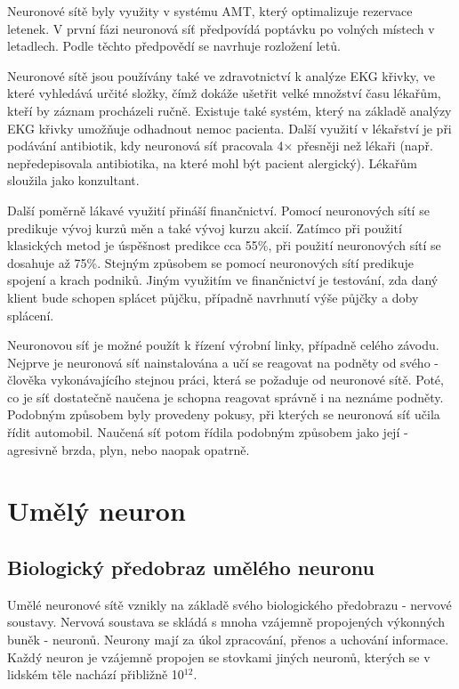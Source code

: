 \documentclass[11pt,twoside,a4paper]{book}
\begin{document}
Neuronové sítě byly využity v systému AMT, který optimalizuje rezervace letenek. V první fázi neuronová síť předpovídá poptávku po volných místech v letadlech. Podle těchto předpovědí se navrhuje rozložení letů.

Neuronové sítě jsou používány také ve zdravotnictví k analýze EKG křivky, ve které vyhledává určité složky, čímž dokáže ušetřit velké množství času lékařům, kteří by záznam procházeli ručně. Existuje také systém, který na základě analýzy EKG křivky umožňuje odhadnout nemoc pacienta. Další využití v lékařství je při podávání antibiotik, kdy neuronová síť pracovala 4\begin{math}\times\end{math} přesněji než lékaři (např. nepředepisovala antibiotika, na které mohl být pacient alergický). Lékařům sloužila jako konzultant.

Další poměrně lákavé využití přináší finančnictví. Pomocí neuronových sítí se predikuje vývoj kurzů měn a také vývoj kurzu akcií. Zatímco při použití klasických metod je úspěšnost predikce cca 55\%, při použití neuronových sítí se dosahuje až 75\%. Stejným způsobem se pomocí neuronových sítí predikuje spojení a krach podniků. Jiným využitím ve finančnictví je testování, zda daný klient bude schopen splácet půjčku, případně navrhnutí výše půjčky a doby splácení.

Neuronovou síť je možné použít k řízení výrobní linky, případně celého závodu. Nejprve je neuronová síť nainstalována a učí se reagovat na podněty od svého  - člověka vykonávajícího stejnou práci, která se požaduje od neuronové sítě. Poté, co je síť dostatečně naučena je schopna reagovat správně i na neznáme podněty. Podobným způsobem byly provedeny pokusy, při kterých se neuronová síť učila řídit automobil. Naučená síť potom řídila podobným způsobem jako její  - agresivně brzda, plyn, nebo naopak opatrně.\cite{kacenka}

\chapter{Umělý neuron}
\section{Biologický předobraz umělého neuronu}
Umělé neuronové sítě vznikly na základě svého biologického předobrazu - nervové soustavy. Nervová soustava se skládá s mnoha vzájemně propojených výkonných buněk - neuronů. Neurony mají za úkol zpracování, přenos a uchování informace. Každý neuron je vzájemně propojen se stovkami jiných neuronů, kterých se v lidském těle nachází přibližně 10\begin{math} ^{12}\end{math}.\cite{skripta}
\end{document}
